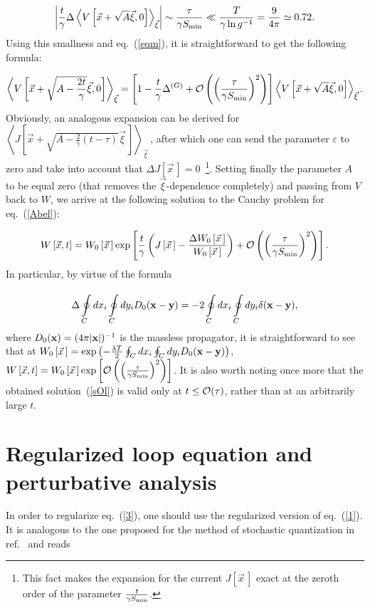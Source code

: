 \documentclass[a4paper,12pt]{article}
\begin{document}
$$\left|\frac{t}{\gamma}\Delta\left<V\left[\vec x+\sqrt{A}\vec\xi, 0\right]\right>_{\vec\xi}\right|
\sim\frac{\tau}{\gamma S_{\rm min}}\ll\frac{T}{\gamma\ln g^{-1}}=\frac{9}{4\pi}\simeq 0.72.$$
Using this smallness and eq.~(\ref{eqm}), it is straightforward to get the following formula:

$$
\left<V\left[\vec x+\sqrt{A-\frac{2t}{\gamma}}\vec\xi, 0\right]\right>_{\vec\xi}=\left[1-\frac{t}{\gamma}
\Delta^{(G)}+{\cal O}\left(\left(\frac{\tau}{\gamma S_{\rm min}}\right)^2\right)\right]
\left<V\left[\vec x+\sqrt{A}\vec\xi, 0\right]\right>_{\vec\xi}.
$$
Obviously, an analogous expansion can be derived for
$\left<J\left[\vec x+\sqrt{A-\frac{2}{\gamma}(t-\tau)}\vec\xi{\,}\right]\right>_{\vec\xi}{\,}$, after which one can send the parameter
$\varepsilon$ to zero and take into account that $\Delta J\left[\vec x{\,}\right]=0$~\footnote{This fact makes the expansion for
the current $J\left[\vec x{\,}\right]$ exact at the zeroth order
of the parameter $\frac{t}{\gamma S_{\rm min}}$.}. Setting finally the parameter $A$ to be equal zero (that removes the
$\vec\xi$-dependence completely) and passing from $V$
back to $W$, we arrive at the following solution to the Cauchy problem for eq.~(\ref{Abel}):

\begin{equation}
\label{sOl}
W\left[\vec x,t\right]=W_0\left[\vec x{\,}\right]\exp\left[\frac{t}{\gamma}\left(J\left[\vec x{\,}\right]-
\frac{\Delta W_0\left[{\vec x}{\,}\right]}{W_0\left[{\vec x}{\,}\right]}\right)+
{\cal O}\left(\left(\frac{\tau}{\gamma S_{\rm min}}\right)^2\right)\right].
\end{equation}
In particular, by virtue of the formula~\cite{le, rev}

\begin{equation}
\label{D0}
\Delta\oint\limits_{C}^{}dx_i\oint\limits_{C}^{}dy_iD_0({\bf x}-{\bf y})=
-2\oint\limits_{C}^{}dx_i\oint\limits_{C}^{}dy_i\delta({\bf x}-{\bf y}),
\end{equation}
where $D_0({\bf x})=(4\pi |{\bf x}|)^{-1}$ is the
massless propagator,
it is straightforward to see that at $W_0\left[\vec x{\,}\right]=\exp\left(-\frac{\lambda T}{2}
\oint_C^{}dx_i\oint_C^{}dy_iD_0({\bf x}-{\bf y})\right)$,
$W\left[\vec x,t\right]=W_0\left[\vec x{\,}\right]\exp\left[
{\cal O}\left(\left(\frac{\tau}{\gamma S_{\rm min}}\right)^2\right)\right]$. It is also worth noting once more
that the obtained solution~(\ref{sOl}) is valid only at $t\le{\cal O}(\tau)$, rather than at an arbitrarily large $t$.


\section{Regularized loop equation and perturbative analysis}
In order to regularize eq.~(\ref{3}), one should use the regularized version of eq.~(\ref{1}). It is analogous to the one proposed for
the method of stochastic quantization in ref.~\cite{bhst} and reads
\end{document}
